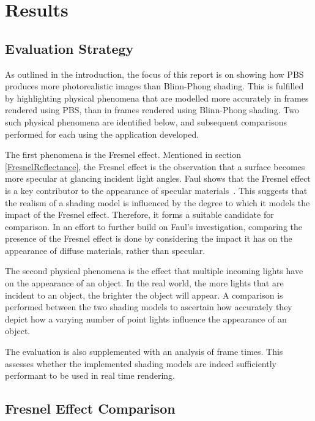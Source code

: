 \chapter{Results}
\label{chapter3}

\section{Evaluation Strategy}

As outlined in the introduction, the focus of this report is on showing how PBS produces more photorealistic images than Blinn-Phong shading. This is fulfilled by highlighting physical phenomena that are modelled more accurately in frames rendered using PBS, than in frames rendered using Blinn-Phong shading. Two such physical phenomena are identified below, and subsequent comparisons performed for each using the application developed.

The first phenomena is the Fresnel effect. Mentioned in section \ref{FresnelReflectance}, the Fresnel effect is the observation that a surface becomes more specular at glancing incident light angles. Faul shows that the Fresnel effect is a key contributor to the appearance of specular materials~\cite{FaulInfluenceOfFresnelEffect}. This suggests that the realism of a shading model is influenced by the degree to which it models the impact of the Fresnel effect. Therefore, it forms a suitable candidate for comparison. In an effort to further build on Faul's investigation, comparing the presence of the Fresnel effect is done by considering the impact it has on the appearance of diffuse materials, rather than specular.

The second physical phenomena is the effect that multiple incoming lights have on the appearance of an object. In the real world, the more lights that are incident to an object, the brighter the object will appear. A comparison is performed between the two shading models to ascertain how accurately they depict how a varying number of point lights influence the appearance of an object.

The evaluation is also supplemented with an analysis of frame times. This assesses whether the implemented shading models are indeed sufficiently performant to be used in real time rendering.

\section{Fresnel Effect Comparison}

